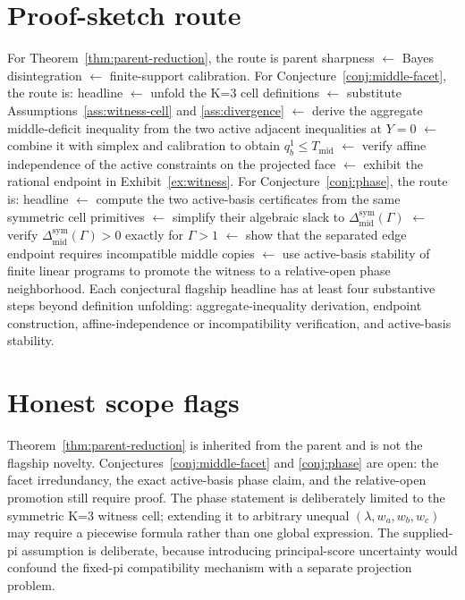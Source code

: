 \documentclass[11pt]{article}
\theoremstyle{definition}
\theoremstyle{plain}
\theoremstyle{remark}
\begin{document}
\section{Proof-sketch route}
For Theorem~\ref{thm:parent-reduction}, the route is parent sharpness \(\leftarrow\) Bayes disintegration \(\leftarrow\) finite-support calibration.  For Conjecture~\ref{conj:middle-facet}, the route is: headline \(\leftarrow\) unfold the K=3 cell definitions \(\leftarrow\) substitute Assumptions~\ref{ass:witness-cell} and \ref{ass:divergence} \(\leftarrow\) derive the aggregate middle-deficit inequality from the two active adjacent inequalities at \(Y=0\) \(\leftarrow\) combine it with simplex and calibration to obtain \(q_b^1\le T_{\mathrm{mid}}\) \(\leftarrow\) verify affine independence of the active constraints on the projected face \(\leftarrow\) exhibit the rational endpoint in Exhibit~\ref{ex:witness}.  For Conjecture~\ref{conj:phase}, the route is: headline \(\leftarrow\) compute the two active-basis certificates from the same symmetric cell primitives \(\leftarrow\) simplify their algebraic slack to \(\Delta_{\mathrm{mid}}^{\mathrm{sym}}(\Gamma)\) \(\leftarrow\) verify \(\Delta_{\mathrm{mid}}^{\mathrm{sym}}(\Gamma)>0\) exactly for \(\Gamma>1\) \(\leftarrow\) show that the separated edge endpoint requires incompatible middle copies \(\leftarrow\) use active-basis stability of finite linear programs to promote the witness to a relative-open phase neighborhood.  Each conjectural flagship headline has at least four substantive steps beyond definition unfolding: aggregate-inequality derivation, endpoint construction, affine-independence or incompatibility verification, and active-basis stability.

\section{Honest scope flags}
Theorem~\ref{thm:parent-reduction} is inherited from the parent and is not the flagship novelty.  Conjectures~\ref{conj:middle-facet} and \ref{conj:phase} are open: the facet irredundancy, the exact active-basis phase claim, and the relative-open promotion still require proof.  The phase statement is deliberately limited to the symmetric K=3 witness cell; extending it to arbitrary unequal \((\lambda,w_a,w_b,w_c)\) may require a piecewise formula rather than one global expression.  The supplied-pi assumption is deliberate, because introducing principal-score uncertainty would confound the fixed-pi compatibility mechanism with a separate projection problem.
\end{document}
